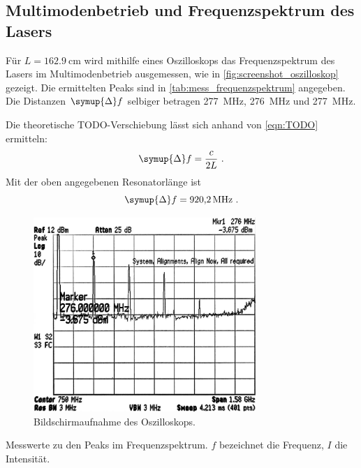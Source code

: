 \subsection{Multimodenbetrieb und Frequenzspektrum des Lasers}
Für $L = \SI{162.9}{\centi\meter}$ wird mithilfe eines Oszilloskops das Frequenzspektrum des Lasers im Multimodenbetrieb ausgemessen,
wie in \autoref{fig:screenshot_oszilloskop} gezeigt.
Die ermittelten Peaks sind in \autoref{tab:mess_frequenzspektrum} angegeben.
Die Distanzen $\symup{\Delta}f$ selbiger betragen
\SI{277}{\mega\hertz},
\SI{276}{\mega\hertz} und
\SI{277}{\mega\hertz}.

Die theoretische TODO-Verschiebung lässt sich anhand von \autoref{eqn:TODO} ermitteln:
\begin{equation}
  \symup{\Delta}f = \frac{c}{2L} \ .
  \label{eqn:TODO}
\end{equation}
Mit der oben angegebenen Resonatorlänge ist
\[
  \symup{\Delta}f = \SI{920.2}{\mega\hertz} \ .
\]


\begin{figure}
  \centering
   \includegraphics[width=0.75\textwidth]{content/img/5_frequenzspektrum_oszilloskop_inverted.jpg}
   \caption{Bildschirmaufnahme des Oszilloskops.}
   \label{fig:screenshot_oszilloskop}
\end{figure}

\begin{table}
  \centering
  \caption{Messwerte zu den Peaks im Frequenzspektrum. $f$ bezeichnet die Frequenz, $I$ die Intensität.}
  \def\belmilliwatt{Bm} %
  \label{tab:mess_frequenzspektrum}
\end{table}



